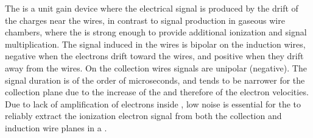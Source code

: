 The    is 
a unit gain device where the electrical signal is produced by the drift of the
charges near the wires, %
in contrast to signal production %
in gaseous wire 
chambers, where the \efield is strong enough to provide additional
ionization and signal multiplication. The signal induced in the 
 wires is bipolar on the induction wires, negative when the
electrons drift toward the wires, and positive when they drift away from
the wires. On the collection wires signals are unipolar (negative).
The signal duration is of the order of microseconds, and tends to be narrower
for the collection plane due to the increase of the \efield and
therefore of the electron velocities. Due to lack of amplification of 
electrons inside , %
 low noise  is
essential for the  to reliably extract the ionization electron signal from both the 
collection and induction wire planes in a  . 

